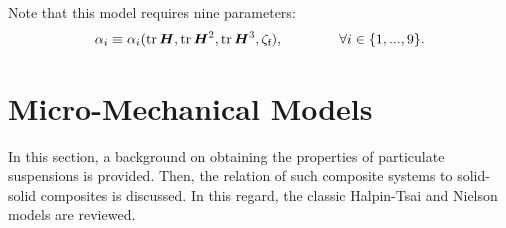 	Note that this model requires nine parameters:
	\begin{alignat}{5}
		\alpha_i\equiv \alpha_i(\tr{\tenb{H}},\tr{\tenb{H}^2},\tr{\tenb{H}^3},\zeta_\text{f}),\qquad\qquad\forall i\in\{1,...,9\}.
	\end{alignat}		













\section{Micro-Mechanical Models}
	In this section, a background on obtaining the properties of particulate suspensions is provided. Then, the relation of such composite systems to solid-solid composites is discussed. In this regard, the classic Halpin-Tsai and Nielson models are reviewed.

